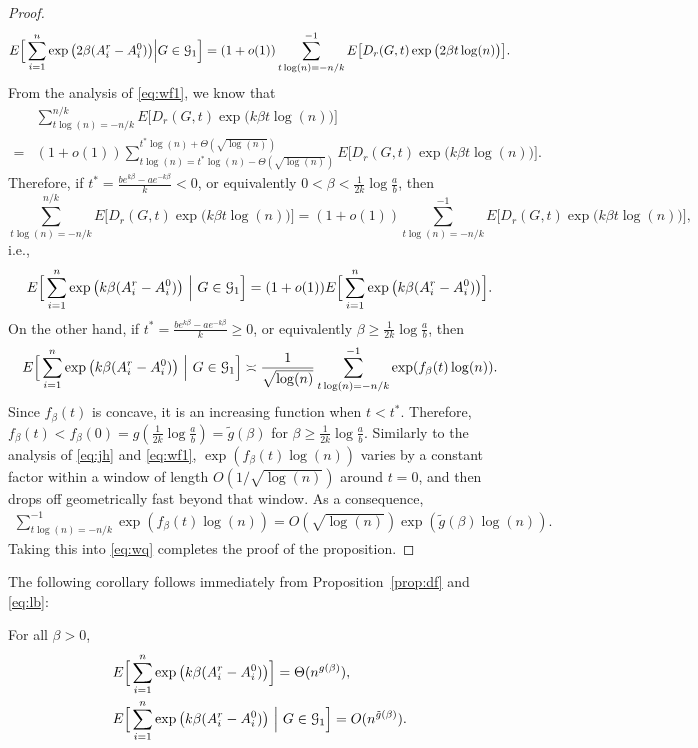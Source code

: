 \documentclass{article}
\begin{document}
\begin{proof}
$$
E\Big[ \sum_{i=1}^n \exp\big(2\beta (A^r_i-A^0_i) \big) \Big| G\in\mathcal{G}_1 \Big]
= (1+o(1)) \sum_{t\log(n)=-n/k}^{-1}
E\big[ D_r(G,t) \exp\big(2\beta t \log(n) \big) \big] .
$$
From the analysis of \eqref{eq:wf1}, we know that 
\begin{align*}
& \sum_{t\log(n)=-n/k}^{n/k}
E\big[ D_r(G,t) \exp\big(k\beta t \log(n) \big) \big]  \\
= & (1+o(1)) \sum_{t\log(n)=t^\ast\log(n)-\Theta(\sqrt{\log(n)})}^{t^\ast\log(n)+\Theta(\sqrt{\log(n)})}
E\big[ D_r(G,t) \exp\big(k\beta t \log(n) \big) \big] .
\end{align*}
Therefore, if $t^\ast=\frac{b e^{k\beta}-a e^{-k\beta}}{k}<0$,
or equivalently $0<\beta<\frac{1}{2k}\log\frac{a}{b}$, then
$$
\sum_{t\log(n)=-n/k}^{n/k}
E\big[ D_r(G,t) \exp\big(k\beta t \log(n) \big) \big] = (1+o(1))
\sum_{t\log(n)=-n/k}^{-1}
E\big[ D_r(G,t) \exp\big(k\beta t \log(n) \big) \big] ,
$$
i.e.,
\begin{equation} \label{eq:bz}
E \Big[ \sum_{i=1}^n  \exp\big(k\beta (A^r_i-A^0_i) \big) ~\Big|~ G\in\mathcal{G}_1 \Big] 
= (1+o(1)) E \Big[ \sum_{i=1}^n  \exp\big(k\beta (A^r_i-A^0_i) \big) \Big] .
\end{equation}
On the other hand,
if $t^\ast=\frac{b e^{k\beta}-a e^{-k\beta}}{k}\ge 0$, or equivalently $\beta\ge\frac{1}{2k}\log\frac{a}{b}$, then
\begin{equation}  \label{eq:wq}
E \Big[ \sum_{i=1}^n  \exp\big(k\beta (A^r_i-A^0_i) \big) ~\Big|~ G\in\mathcal{G}_1 \Big]   
\asymp  \frac{1} {\sqrt{\log(n)}} \sum_{t\log(n)=-n/k}^{-1}
 \exp( f_{\beta}(t) \log(n) ) .
\end{equation}
Since $f_{\beta}(t)$ is concave, it is an increasing function when $t<t^\ast$.
Therefore, $f_{\beta}(t)<f_{\beta}(0)=g(\frac{1}{2k}\log\frac{a}{b})=\tilde{g}(\beta)$ for $\beta\ge\frac{1}{2k}\log\frac{a}{b}$.
Similarly to the analysis of \eqref{eq:jh} and \eqref{eq:wf1},
$\exp( f_{\beta}(t) \log(n))$ varies by a constant factor within a window of length $O(1/\sqrt{\log(n)})$ around $t=0$, and
then drops off geometrically fast beyond that window. As a consequence,
\begin{align*}
\sum_{t\log(n)=-n/k}^{-1}
 \exp( f_{\beta}(t) \log(n) )
=   O(\sqrt{\log(n)}) \exp(\tilde{g}(\beta) \log(n)) .
\end{align*}
Taking this into \eqref{eq:wq} completes the proof of the proposition.
\end{proof}

The following corollary follows immediately from Proposition~\ref{prop:df} and \eqref{eq:lb}:
\begin{corollary} \label{cr:yy}
For all $\beta>0$,
\begin{align*}
& E \Big[ \sum_{i=1}^n  \exp\big(k\beta (A^r_i-A^0_i) \big)  \Big] 
= \Theta(n^{g(\beta)}),  \\
& E \Big[ \sum_{i=1}^n  \exp\big(k\beta (A^r_i-A^0_i) \big) ~\Big|~ G\in\mathcal{G}_1 \Big] 
= O(n^{\tilde{g}(\beta)})  .
\end{align*}
\end{corollary}
\end{document}
